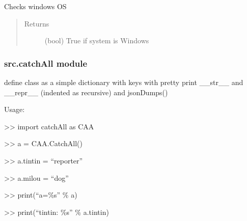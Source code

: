 \documentclass[a4paper,10pt,english]{sphinxmanual}
\begin{document}

\begin{fulllineitems}
\label{\detokenize{apidoc_src/src:src.architecture.is_windows}}
Checks windows OS
\begin{quote}\begin{description}
\item[{Returns}] \leavevmode
(bool) True if system is Windows

\end{description}\end{quote}

\end{fulllineitems}



\subsubsection{src.catchAll module}
\label{\detokenize{apidoc_src/src:module-src.catchAll}}\label{\detokenize{apidoc_src/src:src-catchall-module}}
define class as a simple dictionary with keys
with pretty print \_\_str\_\_ and \_\_repr\_\_ (indented as recursive)
and jsonDumps()

\begin{DUlineblock}{0em}
\item[] Usage:
\item[] \textgreater{}\textgreater{} import catchAll as CAA
\item[] \textgreater{}\textgreater{} a = CAA.CatchAll()
\item[] \textgreater{}\textgreater{} a.tintin = “reporter”
\item[] \textgreater{}\textgreater{} a.milou = “dog”
\item[] \textgreater{}\textgreater{} print(“a=\%s” \% a)
\item[] \textgreater{}\textgreater{} print(“tintin: \%s” \% a.tintin)
\end{DUlineblock}
\end{document}

